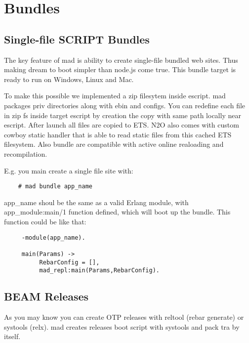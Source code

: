 \section{Bundles}


\subsection{Single-file SCRIPT Bundles}

The key feature of mad is ability to create single-file bundled web sites.
Thus making dream to boot simpler than node.js come true.
This bundle target is ready to run on Windows, Linux and Mac.

To make this possible we implemented a zip filesytem inside escript.
mad packages priv directories along with ebin and configs.
You can redefine each file in zip fs inside target
escript by creation the copy with same path locally near escript.
After launch all files are copied to ETS.
N2O also comes with custom cowboy static handler that is able to
read static files from this cached ETS filesystem.
Also bundle are compatible with active online realoading and recompilation.

E.g. you main create a single file site with:

\vspace{1\baselineskip}
\begin{lstlisting}
    # mad bundle app_name
\end{lstlisting}
\vspace{1\baselineskip}

app\_name shoul be the same as a valid Erlang module, with app\_module:main/1
function defined, which will boot up the bundle. This function could be like that:

\vspace{1\baselineskip}
\begin{lstlisting}
     -module(app_name).

     main(Params) ->
          RebarConfig = [],
          mad_repl:main(Params,RebarConfig).
\end{lstlisting}
\vspace{1\baselineskip}

\subsection{BEAM Releases}

As you may know you can create OTP releases with
reltool (rebar generate) or systools (relx). mad creates releases boot
script with systools and pack tra by itself.

